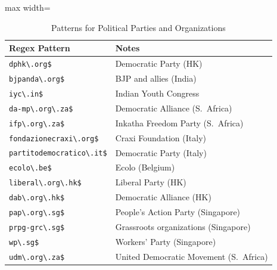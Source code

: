 \documentclass[12pt, letterpaper]{article}
\begin{document}
\begin{table}[!htbp]
\centering
\scriptsize
\setlength\tabcolsep{4 pt}
\caption{Patterns for Political Parties and Organizations}
\label{tab:regex_political_parties_organizations}
\begin{adjustbox}{max width=\linewidth}
\begin{tabular}{@{\hspace{0\tabcolsep}}ll@{\hspace{0\tabcolsep}}}
\toprule
\textbf{Regex Pattern} & \textbf{Notes} \\
\midrule
\verb|dphk\.org$| & Democratic Party (HK) \\
\verb|bjpanda\.org$| & BJP and allies (India) \\
\verb|iyc\.in$| & Indian Youth Congress \\
\verb|da-mp\.org\.za$| & Democratic Alliance (S.~Africa) \\
\verb|ifp\.org\.za$| & Inkatha Freedom Party (S.~Africa) \\
\verb|fondazionecraxi\.org$| & Craxi Foundation (Italy) \\
\verb|partitodemocratico\.it$| & Democratic Party (Italy) \\
\verb|ecolo\.be$| & Ecolo (Belgium) \\
\verb|liberal\.org\.hk$| & Liberal Party (HK) \\
\verb|dab\.org\.hk$| & Democratic Alliance (HK) \\
\verb|pap\.org\.sg$| & People's Action Party (Singapore) \\
\verb|prpg-grc\.sg$| & Grassroots organizations (Singapore) \\
\verb|wp\.sg$| & Workers' Party (Singapore) \\
\verb|udm\.org\.za$| & United Democratic Movement (S.~Africa) \\
\bottomrule
\end{tabular}
\end{adjustbox}
\end{table}
\end{document}
